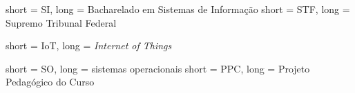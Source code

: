 {
    short = SI,
    long = Bacharelado em Sistemas de Informação
}
{
    short = STF,
    long = Supremo Tribunal Federal
}

{
    short = IoT,
    long = \emph{Internet of Things}
}

{
    short = SO,
    long = sistemas operacionais
}
{
    short = PPC,
    long = Projeto Pedagógico do Curso
}